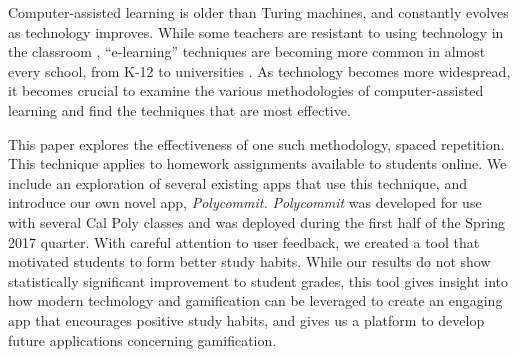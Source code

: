 \par Computer-assisted learning is older than Turing machines, and constantly evolves as technology improves. While some teachers are resistant to using technology in the classroom \cite{BJET:BJET12051}, ``e-learning'' techniques are becoming more common in almost every school, from K-12 to universities \cite{EJED:EJED12020}. As technology becomes more widespread, it becomes crucial to examine the various methodologies of computer-assisted learning and find the techniques that are most effective.

\par This paper explores the effectiveness of one such methodology, spaced repetition. This technique applies to homework assignments available to students online. We include an exploration of several existing apps that use this technique, and introduce our own novel app, \textit{Polycommit.} \textit{Polycommit} was developed for use with several Cal Poly classes and was deployed during the first half of the Spring 2017 quarter. With careful attention to user feedback, we created a tool that motivated students to form better study habits. While our results do not show statistically significant improvement to student grades, this tool gives insight into how modern technology and gamification can be leveraged to create an engaging app that encourages positive study habits, and gives us a platform to develop future applications concerning gamification.